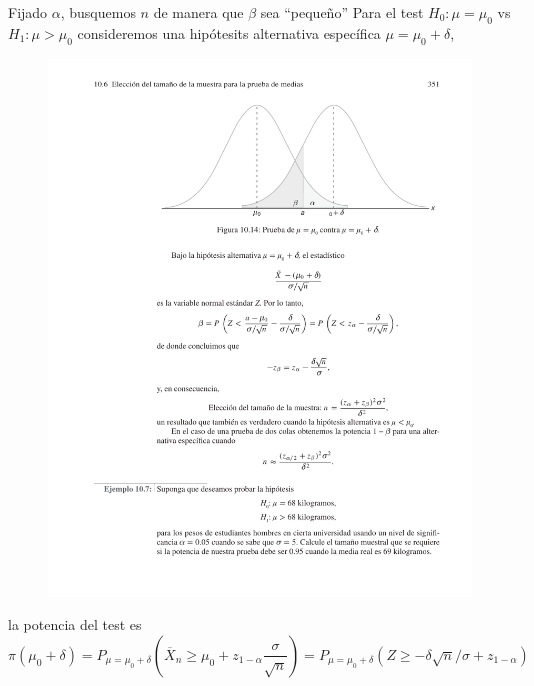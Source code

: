 \documentclass{beamer}
\theoremstyle{definition}
\begin{document}
\begin{frame}{\color{rosee}Fijado $\alpha$, busquemos $n$ de manera que $\beta$ sea ``pequeño''}\small
Para el test $H_0:\mu=\mu_0$ vs $H_1:\mu>\mu_0$ consideremos una hipótesits alternativa espec\'ifica $\mu = \mu_0 + \delta$, 
  \begin{figure}
    \centering
    \includegraphics[height=.4\textheight]{img/eleccion_n.pdf}
  \end{figure}
  la potencia del test es 
  \[ \pi(\mu_{0}+\delta)  = P_{\mu = \mu_0 + \delta} \left(\overline{X}_n\geq \mu_0 +
      z_{1-\alpha}\frac{\sigma}{\sqrt{n}} \right) = P_{\mu = \mu_0 + \delta} (Z \geq -
      \delta \sqrt{n}/\sigma + z_ {1-\alpha})\]
\end{frame}
\end{document}
